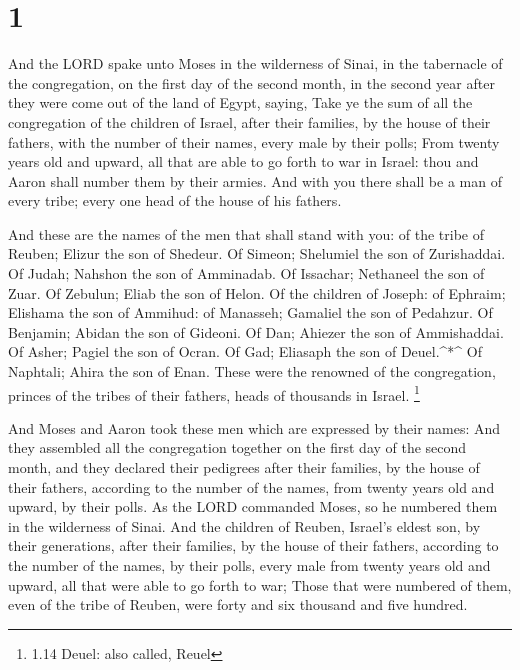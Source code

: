 \hypertarget{section}{%
\section{1}\label{section}}

 And the LORD spake unto Moses in the wilderness of Sinai,
in the tabernacle of the congregation, on the first day of the second
month, in the second year after they were come out of the land of Egypt,
saying,  Take ye the sum of all the congregation of the
children of Israel, after their families, by the house of their fathers,
with the number of their names, every male by their polls; 
From twenty years old and upward, all that are able to go forth to war
in Israel: thou and Aaron shall number them by their armies.
 And with you there shall be a man of every tribe; every one
head of the house of his fathers.

 And these are the names of the men that shall stand with
you: of the tribe of Reuben; Elizur the son of Shedeur.  Of
Simeon; Shelumiel the son of Zurishaddai.  Of Judah; Nahshon
the son of Amminadab.  Of Issachar; Nethaneel the son of
Zuar.  Of Zebulun; Eliab the son of Helon.  Of
the children of Joseph: of Ephraim; Elishama the son of Ammihud: of
Manasseh; Gamaliel the son of Pedahzur.  Of Benjamin;
Abidan the son of Gideoni.  Of Dan; Ahiezer the son of
Ammishaddai.  Of Asher; Pagiel the son of Ocran.
 Of Gad; Eliasaph the son of Deuel.\^{}*\^{} 
Of Naphtali; Ahira the son of Enan.  These were the
renowned of the congregation, princes of the tribes of their fathers,
heads of thousands in Israel. \footnote{1.14 Deuel: also called, Reuel}

 And Moses and Aaron took these men which are expressed by
their names:  And they assembled all the congregation
together on the first day of the second month, and they declared their
pedigrees after their families, by the house of their fathers, according
to the number of the names, from twenty years old and upward, by their
polls.  As the LORD commanded Moses, so he numbered them in
the wilderness of Sinai.  And the children of Reuben,
Israel's eldest son, by their generations, after their families, by the
house of their fathers, according to the number of the names, by their
polls, every male from twenty years old and upward, all that were able
to go forth to war;  Those that were numbered of them, even
of the tribe of Reuben, were forty and six thousand and five hundred.


